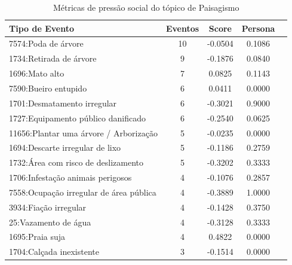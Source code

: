 \begin{table}[htbp]
	\centering
	\caption{Métricas de pressão social do tópico de Paisagismo}
	\label{tab:eventos_populares_landscape}
	\begin{tabular}{|l|c|c|c|c|}
		\hline
		\textbf{Tipo de Evento}                 & \textbf{Eventos} & \textbf{Score} & \textbf{Persona} \\
		\hline
		7574:Poda de árvore                     & 10               & -0.0504        & 0.1086           \\
		\hline
		1734:Retirada de árvore                 & 9                & -0.1876        & 0.0840           \\
		\hline
		1696:Mato alto                          & 7                & 0.0825         & 0.1143           \\
		\hline
		7590:Bueiro entupido                    & 6                & 0.0411         & 0.0000           \\
		\hline
		1701:Desmatamento irregular             & 6                & -0.3021        & 0.9000           \\
		\hline
		1727:Equipamento público danificado     & 6                & -0.2540        & 0.0625           \\
		\hline
		11656:Plantar uma árvore / Arborização  & 5                & -0.0235        & 0.0000           \\
		\hline
		1694:Descarte irregular de lixo         & 5                & -0.1186        & 0.2759           \\
		\hline
		1732:Área com risco de deslizamento     & 5                & -0.3202        & 0.3333           \\
		\hline
		1706:Infestação animais perigosos       & 4                & -0.1076        & 0.2857           \\
		\hline
		7558:Ocupação irregular de área pública & 4                & -0.3889        & 1.0000           \\
		\hline
		3934:Fiação irregular                   & 4                & -0.1428        & 0.3750           \\
		\hline
		25:Vazamento de água                    & 4                & -0.3128        & 0.3333           \\
		\hline
		1695:Praia suja                         & 4                & 0.4822         & 0.0000           \\
		\hline
		1704:Calçada inexistente                & 3                & -0.1514        & 0.0000           \\

\end{tabular}
\end{table}
